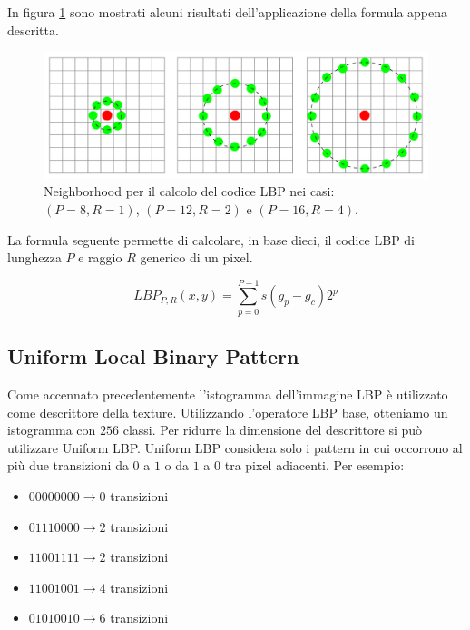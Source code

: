 In figura \ref{fig:NeighborhoodLBP} sono mostrati alcuni risultati dell'applicazione della formula appena descritta.

\begin{figure}[ht]
\begin{center}
\includegraphics[width=.95\textwidth]{img/raggio_LBP}
\caption{ Neighborhood per il calcolo del codice LBP nei casi: $(P=8, R=1)$, $(P=12, R=2)$ e $(P=16, R=4)$. }
\label{fig:NeighborhoodLBP}
\end{center}
\end{figure}


La formula seguente permette di calcolare, in base dieci, il codice LBP di lunghezza $P$ e raggio $R$ generico di un pixel.

\begin{equation}
LBP_{P,R}(x, y) = \sum_{p=0}^{P-1}{s(g_p - g_c)2^p}
\end{equation}

\subsection{Uniform Local Binary Pattern}
Come accennato precedentemente l'istogramma dell'immagine LBP è utilizzato come descrittore della texture. Utilizzando l'operatore LBP base, otteniamo un istogramma con $256$ classi. Per ridurre la dimensione del descrittore si può utilizzare Uniform \acf{LBP}. Uniform \acs{LBP} considera solo i pattern in cui occorrono al più due transizioni da $0$ a $1$ o da $1$ a $0$ tra pixel adiacenti. Per esempio:

\begin{itemize}
	\item $00000000 \rightarrow 0$ transizioni
	\item $01110000 \rightarrow 2$ transizioni
	\item $11001111 \rightarrow 2$ transizioni
	\item $11001001 \rightarrow 4$ transizioni
	\item $01010010 \rightarrow 6$ transizioni
\end{itemize}

